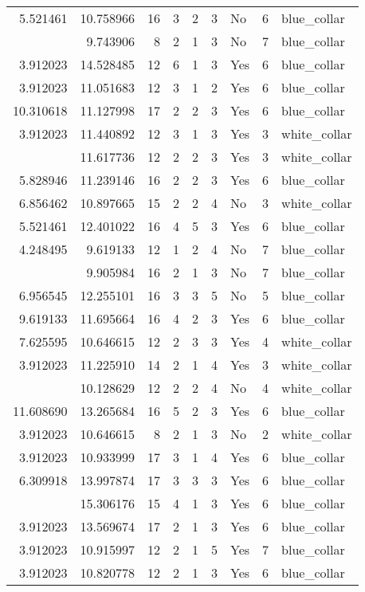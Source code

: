 \documentclass[
]{article}
\begin{document}
\begin{longtable}[t]{rrrrrllrl}
5.521461 & 10.758966 & 16 & 3 & 2 & 3 & No & 6 & blue\_collar\\
\addlinespace
3.912023 & 9.743906 & 8 & 2 & 1 & 3 & No & 7 & blue\_collar\\
3.912023 & 14.528485 & 12 & 6 & 1 & 3 & Yes & 6 & blue\_collar\\
3.912023 & 11.051683 & 12 & 3 & 1 & 2 & Yes & 6 & blue\_collar\\
10.310618 & 11.127998 & 17 & 2 & 2 & 3 & Yes & 6 & blue\_collar\\
3.912023 & 11.440892 & 12 & 3 & 1 & 3 & Yes & 3 & white\_collar\\
\addlinespace
10.820778 & 11.617736 & 12 & 2 & 2 & 3 & Yes & 3 & white\_collar\\
5.828946 & 11.239146 & 16 & 2 & 2 & 3 & Yes & 6 & blue\_collar\\
6.856462 & 10.897665 & 15 & 2 & 2 & 4 & No & 3 & white\_collar\\
5.521461 & 12.401022 & 16 & 4 & 5 & 3 & Yes & 6 & blue\_collar\\
4.248495 & 9.619133 & 12 & 1 & 2 & 4 & No & 7 & blue\_collar\\
\addlinespace
3.912023 & 9.905984 & 16 & 2 & 1 & 3 & No & 7 & blue\_collar\\
6.956545 & 12.255101 & 16 & 3 & 3 & 5 & No & 5 & blue\_collar\\
9.619133 & 11.695664 & 16 & 4 & 2 & 3 & Yes & 6 & blue\_collar\\
7.625595 & 10.646615 & 12 & 2 & 3 & 3 & Yes & 4 & white\_collar\\
3.912023 & 11.225910 & 14 & 2 & 1 & 4 & Yes & 3 & white\_collar\\
\addlinespace
4.007333 & 10.128629 & 12 & 2 & 2 & 4 & No & 4 & white\_collar\\
11.608690 & 13.265684 & 16 & 5 & 2 & 3 & Yes & 6 & blue\_collar\\
3.912023 & 10.646615 & 8 & 2 & 1 & 3 & No & 2 & white\_collar\\
3.912023 & 10.933999 & 17 & 3 & 1 & 4 & Yes & 6 & blue\_collar\\
6.309918 & 13.997874 & 17 & 3 & 3 & 3 & Yes & 6 & blue\_collar\\
\addlinespace
3.912023 & 15.306176 & 15 & 4 & 1 & 3 & Yes & 6 & blue\_collar\\
3.912023 & 13.569674 & 17 & 2 & 1 & 3 & Yes & 6 & blue\_collar\\
3.912023 & 10.915997 & 12 & 2 & 1 & 5 & Yes & 7 & blue\_collar\\
3.912023 & 10.820778 & 12 & 2 & 1 & 3 & Yes & 6 & blue\_collar\\

\end{longtable}
\end{document}
